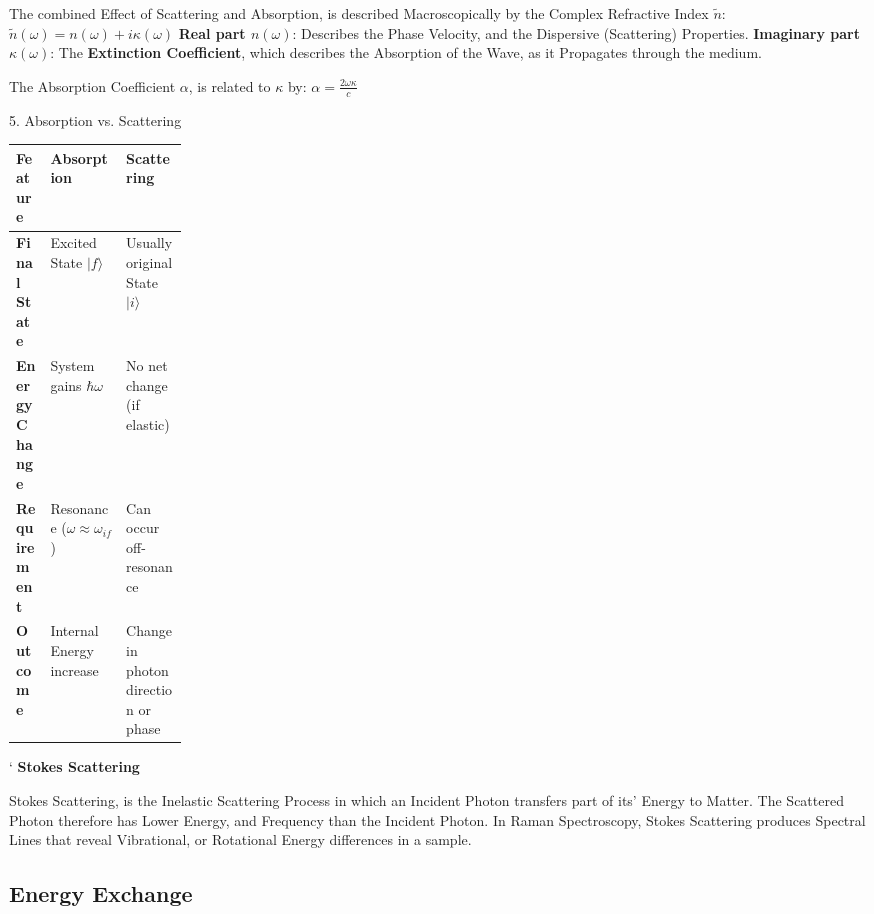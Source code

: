 \documentclass[a4paper, 10pt, onepage]{elegantbook}
\begin{document}
{\noindent

The combined Effect of Scattering and Absorption, is described Macroscopically by the Complex Refractive Index 
$\tilde{n}$:  
$ \tilde{n}(\omega) = n(\omega) + i\kappa(\omega) $  
  \textbf{Real part $n(\omega)$}: Describes the Phase Velocity, and the Dispersive (Scattering) Properties.  
  \textbf{Imaginary part $\kappa(\omega)$}: The \textbf{Extinction Coefficient}, which describes the Absorption of the 
Wave, as it Propagates through the medium.  

The Absorption Coefficient $\alpha$, is related to $\kappa$ by:  
$ \alpha = \frac{2\omega \kappa}{c} $  

    5. Absorption vs. Scattering  

\begin{table}[ht]
\centering
\begin{tabularx}{\linewidth}{
  >{\raggedright\arraybackslash}p{0.20\linewidth}
  >{\raggedright\arraybackslash}X
  >{\raggedright\arraybackslash}X
}
\toprule
\textbf{Feature} & \textbf{Absorption} & \textbf{Scattering} \\
\midrule
\textbf{Final State} & Excited State $\lvert f\rangle$ &
Usually original State $\lvert i\rangle$ \\

\textbf{Energy Change} & System gains $\hbar\omega$ &
No net change (if elastic) \\

\textbf{Requirement} & Resonance ($\omega \approx \omega_{if}$) &
Can occur off-resonance \\

\textbf{Outcome} & Internal Energy increase &
Change in photon direction or phase \\
\bottomrule
\end{tabularx}
\end{table}

`    \textbf{Stokes Scattering}
    
\noindent   

Stokes Scattering, is the Inelastic Scattering Process in which an Incident Photon transfers part of its' Energy to 
Matter. The Scattered Photon therefore has Lower Energy, and Frequency than the Incident Photon. In Raman Spectroscopy, 
Stokes Scattering produces Spectral Lines that reveal Vibrational, or Rotational Energy differences in a
sample.  

\subsection{Energy Exchange}

}
\end{document}
